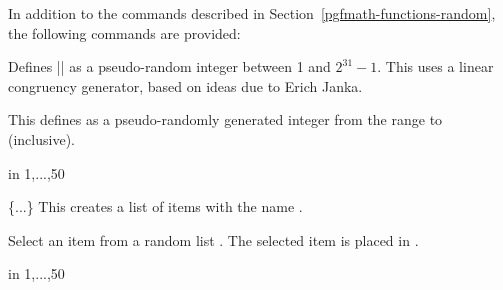 \label{pgfmath-random}

In addition to the commands described in
Section~\ref{pgfmath-functions-random},
the following commands are provided:

\begin{command}{\pgfmathgeneratepseudorandomnumber}
	Defines |\pgfmathresult| as a pseudo-random integer between 1 and
	$2^{31}-1$. This uses a linear congruency generator, based on ideas
	due to Erich Janka.
\end{command}

\begin{command}{\pgfmathrandominteger{}}
	This defines  as a pseudo-randomly generated integer from
	the range  to  (inclusive).

\begin{codeexample}[]
\begin{pgfpicture}
   \foreach \x in {1,...,50}{
      \color{blue!40!white}
   }
\end{pgfpicture}
\end{codeexample}
\end{command}

\begin{command}{\pgfmathdeclarerandomlist{}\{...\}}
	This creates a list of items with the name .
\end{command}

\begin{command}{\pgfmathrandomitem{}}
	Select an item from a random list . The
	selected item is placed in .
\end{command}

\begin{codeexample}[]
\begin{pgfpicture}
   \foreach \a in {1,...,50}{
      \color{\c!40!white}
   }
\end{pgfpicture}
\end{codeexample}

